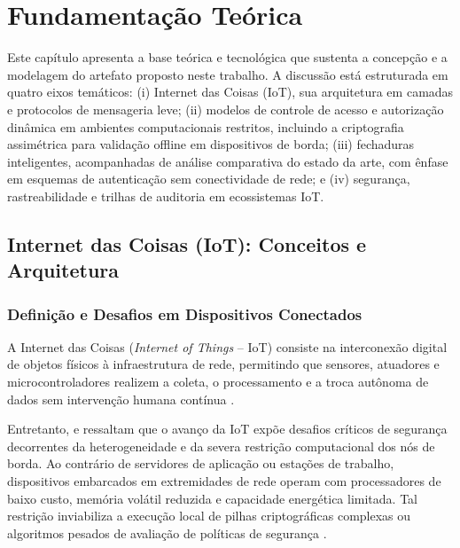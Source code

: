 \chapter{Fundamentação Teórica}
\label{cap:fundamentacao}

Este capítulo apresenta a base teórica e tecnológica que sustenta a concepção e a modelagem do artefato proposto neste trabalho. A discussão está estruturada em quatro eixos temáticos: (i) Internet das Coisas (IoT), sua arquitetura em camadas e protocolos de mensageria leve; (ii) modelos de controle de acesso e autorização dinâmica em ambientes computacionais restritos, incluindo a criptografia assimétrica para validação offline em dispositivos de borda; (iii) fechaduras inteligentes, acompanhadas de análise comparativa do estado da arte, com ênfase em esquemas de autenticação sem conectividade de rede; e (iv) segurança, rastreabilidade e trilhas de auditoria em ecossistemas IoT.

\section{Internet das Coisas (IoT): Conceitos e Arquitetura}
\label{sec:iot}

\subsection{Definição e Desafios em Dispositivos Conectados}
\label{subsec:iot-definicao}

A Internet das Coisas (\textit{Internet of Things} -- IoT) consiste na interconexão digital de objetos físicos à infraestrutura de rede, permitindo que sensores, atuadores e microcontroladores realizem a coleta, o processamento e a troca autônoma de dados sem intervenção humana contínua \cite{vardakis2024}.

Entretanto,  e  ressaltam que o avanço da IoT expõe desafios críticos de segurança decorrentes da heterogeneidade e da severa restrição computacional dos nós de borda. Ao contrário de servidores de aplicação ou estações de trabalho, dispositivos embarcados em extremidades de rede operam com processadores de baixo custo, memória volátil reduzida e capacidade energética limitada. Tal restrição inviabiliza a execução local de pilhas criptográficas complexas ou algoritmos pesados de avaliação de políticas de segurança \cite{surveysmarthomeauth2021}. 

